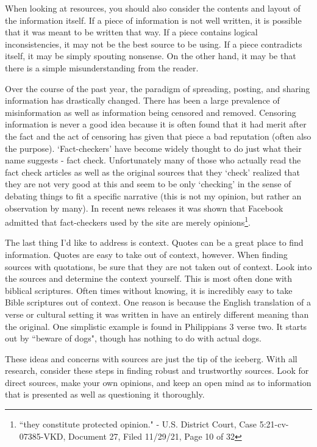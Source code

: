 \documentclass[10pt, a4paper, twocolumn]{book}
\begin{document}
When looking at resources, you should also consider the contents and layout of the information itself. If a piece of information is not well written, it is possible that it was meant to be written that way. If a piece contains logical inconsistencies, it may not be the best source to be using. If a piece contradicts itself, it may be simply spouting nonsense. On the other hand, it may be that there is a simple misunderstanding from the reader. 

Over the course of the past year, the paradigm of spreading, posting, and sharing information has drastically changed. There has been a large prevalence of misinformation as well as information being censored and removed. Censoring information is never a good idea because it is often found that it had merit after the fact and the act of censoring has given that piece a bad reputation (often also the purpose). `Fact-checkers' have become widely thought to do just what their name suggests - fact check. Unfortunately many of those who actually read the fact check articles as well as the original sources that they `check' realized that they are not very good at this and seem to be only `checking' in the sense of debating things to fit a specific narrative (this is not my opinion, but rather an observation by many). In recent news releases it was shown that Facebook admitted that fact-checkers used by the site are merely opinions\footnote{``they constitute protected opinion." - U.S. District Court, Case 5:21-cv-07385-VKD, Document 27, Filed 11/29/21, Page 10 of 32}.

The last thing I'd like to address is context. Quotes can be a great place to find information. Quotes are easy to take out of context, however. When finding sources with quotations, be sure that they are not taken out of context. Look into the sources and determine the context yourself. This is most often done with biblical scriptures. Often times without knowing, it is incredibly easy to take Bible scriptures out of context. One reason is because the English translation of a verse or cultural setting it was written in have an entirely different meaning than the original. One simplistic example is found in Philippians 3 verse two. It starts out by ``beware of dogs", though has nothing to do with actual dogs. 

These ideas and concerns with sources are just the tip of the iceberg. With all research, consider these steps in finding robust and trustworthy sources. Look for direct sources, make your own opinions, and keep an open mind as to information that is presented as well as questioning it thoroughly.
\end{document}
